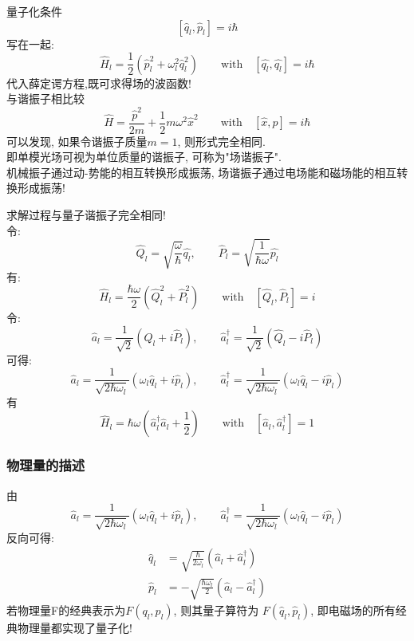 \begin{frame}    
    量子化条件
    \[  [\hat{q}_l,\hat{p}_l]=i\hbar \] 
    写在一起:
    \[ \hat{H}_l  =  \frac{1}{2}(\hat{p}_l ^2 + \omega_l ^2 \hat{q}_l ^2 )  \qquad \text{with} \quad [\hat{q_l},\hat{q_l}] =i\hbar\] 
    代入薛定谔方程,既可求得场的波函数! \\ {\vspace*{1em}}
    与谐振子相比较
    \begin{equation*}
        \hat{H} = \frac{\hat{p}^2 }{2m} + \dfrac{1}{2} m \omega ^2 \hat{x}^2   \qquad \text{with} \quad [\hat{x},\hat{p}]=i\hbar 
    \end{equation*}	
    可以发现, 如果令谐振子质量$m =1$, 则形式完全相同.  \\ 
    即单模光场可视为单位质量的谐振子, 可称为"场谐振子". \\ 
    机械振子通过动-势能的相互转换形成振荡, 场谐振子通过电场能和磁场能的相互转换形成振荡!
\end{frame}

\begin{frame}   
  求解过程与量子谐振子完全相同! \\
    令:
    \[ \hat{Q}_l = \sqrt{\frac{\omega}{\hbar}}\hat{q_l}, \qquad \hat{P}_l = \sqrt{\frac{1}{\hbar \omega}} \hat{p_l} \]
    有:
    \[  \hat{H}_l= \frac{\hbar \omega }{2} (\hat{Q}^2 _l + \hat{P}^2 _l) \qquad \text{with} \quad [\hat{Q}_l,\hat{P}_l]=i \]
    令:
    \[ \hat{a}_l= \frac{1 }{\sqrt{2}} (\hat{Q} _l+ i\hat{P}_l ), \qquad \hat{a}^\dagger _l = \frac{1 }{\sqrt{2}} (\hat{Q}_l - i\hat{P}_l ) \]
    可得:
    \[
        \hat{a}_l = \frac{1}{\sqrt{2\hbar \omega_l}} (\omega_l\hat{q}_l+i \hat{p}_l)  , \qquad
        \hat{a}_l ^\dagger = \frac{1}{\sqrt{2\hbar \omega_l}} (\omega_l\hat{q}_l-i \hat{p}_l)  
    \]  
    有
    \[  \hat{H}_l= \hbar \omega \left(\hat{a}^\dagger _l \hat{a} _l + \frac{1 }{2}\right) \qquad \text{with} \quad [\hat{a}_l,\hat{a}^\dagger _l]=1 \]
\end{frame}

\begin{frame}
      \frametitle{物理量的描述}
      由
      \[
        \hat{a}_l = \frac{1}{\sqrt{2\hbar \omega_l}} (\omega_l\hat{q}_l+i \hat{p}_l)  , \qquad
        \hat{a}_l ^\dagger = \frac{1}{\sqrt{2\hbar \omega_l}} (\omega_l\hat{q}_l-i \hat{p}_l)  
        \]  
      反向可得: 
      \[ \begin{aligned}
         \hat{q}_l &= \sqrt{\frac{\hbar}{ 2\omega_l}} (\hat{a}_l+ \hat{a}_l ^\dagger) \\ 
         \hat{p}_l &= -\sqrt{\frac{\hbar\omega_l}{2 }} (\hat{a}_l- \hat{a}_l ^\dagger)  
      \end{aligned} \] 
    若物理量F的经典表示为$F(q_l, p_l)$, 则其量子算符为 $F(\hat{q}_l, \hat{p}_l)$, 即电磁场的所有经典物理量都实现了量子化!     
\end{frame}

